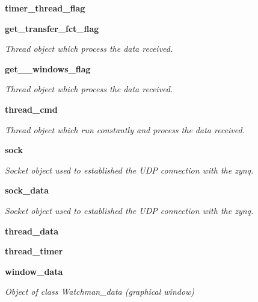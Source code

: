\begin{DoxyCompactItemize}
\mbox{\label{classwatchman_1_1_watchman__main__window_a5702507d1b28f4c702ea7ac21fe3838d}} 
{\bfseries timer\+\_\+thread\+\_\+flag}
\item 
\mbox{\label{classwatchman_1_1_watchman__main__window_ae25e348d78206fb78fc5770590d2ceb6}} 
\textbf{ get\+\_\+transfer\+\_\+fct\+\_\+flag}
\begin{DoxyCompactList}\small\item\em Thread object which process the data received. \end{DoxyCompactList}\item 
\mbox{\label{classwatchman_1_1_watchman__main__window_ad5fdd038b4c5784a0215f797e6d4f3d0}} 
\textbf{ get\+\_\+\_\+windows\+\_\+flag}
\begin{DoxyCompactList}\small\item\em Thread object which process the data received. \end{DoxyCompactList}\item 
\mbox{\label{classwatchman_1_1_watchman__main__window_ad85cee0f1a7151f5432e14c9035dcd08}} 
\textbf{ thread\+\_\+cmd}
\begin{DoxyCompactList}\small\item\em Thread object which run constantly and process the data received. \end{DoxyCompactList}\item 
\mbox{\label{classwatchman_1_1_watchman__main__window_a2915b2132c21f91032c59d8217412142}} 
\textbf{ sock}
\begin{DoxyCompactList}\small\item\em Socket object used to established the U\+DP connection with the zynq. \end{DoxyCompactList}\item 
\mbox{\label{classwatchman_1_1_watchman__main__window_a4507da6084d3549ba483b43572a575fe}} 
\textbf{ sock\+\_\+data}
\begin{DoxyCompactList}\small\item\em Socket object used to established the U\+DP connection with the zynq. \end{DoxyCompactList}\item 
\mbox{\label{classwatchman_1_1_watchman__main__window_a69cda14568d01651d907a5e289e3ab99}} 
{\bfseries thread\+\_\+data}
\item 
\mbox{\label{classwatchman_1_1_watchman__main__window_ad540b9d5fc5959783f5ee5031dc2514e}} 
{\bfseries thread\+\_\+timer}
\item 
\mbox{\label{classwatchman_1_1_watchman__main__window_aa6a1ea8eeed86393fa27029714047fdd}} 
\textbf{ window\+\_\+data}
\begin{DoxyCompactList}\small\item\em Object of class Watchman\+\_\+data (graphical window) \end{DoxyCompactList}\end{DoxyCompactItemize}


